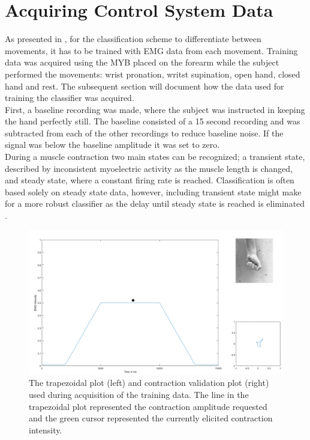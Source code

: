 
\section{Acquiring Control System Data}

As presented in , for the classification scheme to differentiate between movements, it has to be trained with EMG data from each movement. Training data was acquired using the MYB placed on the forearm while the subject performed the movements: wrist pronation, writst supination, open hand, closed hand and rest. The subsequent section will document how the data used for training the classifier was acquired. \\
First, a baseline recording was made, where the subject was instructed in keeping the hand perfectly still. The baseline consisted of a 15 second recording and was subtracted from each of the other recordings to reduce baseline noise. If the signal was below the baseline amplitude it was set to zero. \\
During a muscle contraction two main states can be recognized; a transient state, described by inconsistent myoelectric activity as the muscle length is changed, and steady state, where a constant firing rate is reached. \cite{Mobarak2014} Classification is often based solely on steady state data, however, including transient state might make for a more robust classifier as the delay until steady state is reached is eliminated \cite{Boschmann2013,Mobarak2014a}. \\
%

\begin{figure}[H]                 
	\includegraphics[width=.8\textwidth]{figures/trapezoid}  
	\caption{The trapezoidal plot (left) and contraction validation plot (right) used during acquisition of the training data. The line in the trapezoidal plot represented the contraction amplitude requested and the green cursor represented the currently elicited contraction intensity. }
	\label{fig:GUI} 
\end{figure}
\vspace{-1em}

